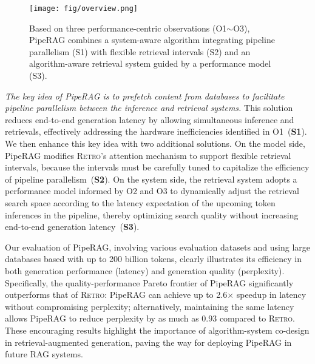 \begin{figure*}[t]
	\centering
  \texttt{[image: fig/overview.png]}
  \vspace{-1.2em}
  \caption{Based on three performance-centric observations (O1$\sim$O3), PipeRAG combines a system-aware algorithm integrating pipeline parallelism (S1) with flexible retrieval intervals (S2) and an algorithm-aware retrieval system guided by a performance model (S3).}
  \vspace{-1.2em}
  \label{fig:overview}
\end{figure*}

\textit{The key idea of PipeRAG is to prefetch content from databases to facilitate pipeline parallelism between the inference and retrieval systems.} This solution reduces end-to-end generation latency by allowing simultaneous inference and retrievals, effectively addressing the hardware inefficiencies identified in O1~(\textbf{S1}). 
We then enhance this key idea with two additional solutions.
On the model side, PipeRAG modifies \textsc{Retro}'s attention mechanism to support flexible retrieval intervals, because the intervals must be carefully tuned to capitalize the efficiency of pipeline parallelism~(\textbf{S2}). 
On the system side, the retrieval system adopts a performance model informed by O2 and O3 to dynamically adjust the retrieval search space according to the latency expectation of the upcoming token inferences in the pipeline, thereby optimizing search quality without increasing end-to-end generation latency~(\textbf{S3}).

Our evaluation of PipeRAG, involving various evaluation datasets and using large databases based with up to 200 billion tokens, clearly illustrates its efficiency in both generation performance (latency) and generation quality (perplexity). Specifically, the quality-performance Pareto frontier of PipeRAG significantly outperforms that of \textsc{Retro}: PipeRAG can achieve up to 2.6$\times$ speedup in latency without compromising perplexity; alternatively, maintaining the same latency allows PipeRAG to reduce perplexity by as much as 0.93 compared to \textsc{Retro}. These encouraging results highlight the importance of algorithm-system co-design in retrieval-augmented generation, paving the way for deploying PipeRAG in future RAG systems.


